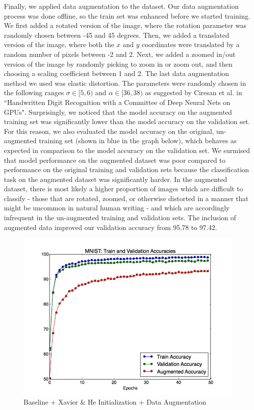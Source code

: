 \documentclass[a4paper]{article}
\begin{document}
\begin{enumerate}
{Finally, we applied data augmentation to the dataset. Our data augmentation process was done offline, so the train set was enhanced before we started training. We first added a rotated version of the image, where the rotation parameter was randomly chosen between -45 and 45 degrees. Then, we added a translated version of the image, where both the $x$ and $y$ coordinates were translated by a random number of pixels between -2 and 2. Next, we added a zoomed in/out version of the image by randomly picking to zoom in or zoom out, and then choosing a scaling coefficient between 1 and 2. The last data augmentation method we used was elastic distortion. The parameters were randomly chosen in the following ranges $\sigma \in [5,6)$ and $\alpha \in [36,38)$ as suggested by Ciresan et al. in ``Handwritten Digit Recognition with a Committee of Deep Neural Nets on GPUs".
\newline
\newline
Surprisingly, we noticed that the model accuracy on the augmented training set was significantly lower than the model accuracy on the validation set. For this reason, we also evaluated the model accuracy on the original, un-augmented training set (shown in blue in the graph below), which behaves as expected in comparison to the model accuracy on the validation set. We surmised that model performance on the augmented dataset was poor compared to performance on the original training and validation sets because the classification task on the augmented dataset was significantly harder. In the augmented dataset, there is most likely a higher proportion of images which are difficult to classify - those that are rotated, zoomed, or otherwise distorted in a manner that might be uncommon in natural human writing - and which are accordingly infrequent in the un-augmented training and validation sets.  The inclusion of augmented data improved our validation accuracy from 95.78 to 97.42.

\begin{figure}[H]
  \includegraphics[width=12cm]{../plots/accuracies_augmented.jpg}
  \centering
  \caption{Baseline + Xavier \& He Initialization + Data Augmentation}
  \label{fig:boat1}
\end{figure}

}
\end{enumerate}
\end{document}
